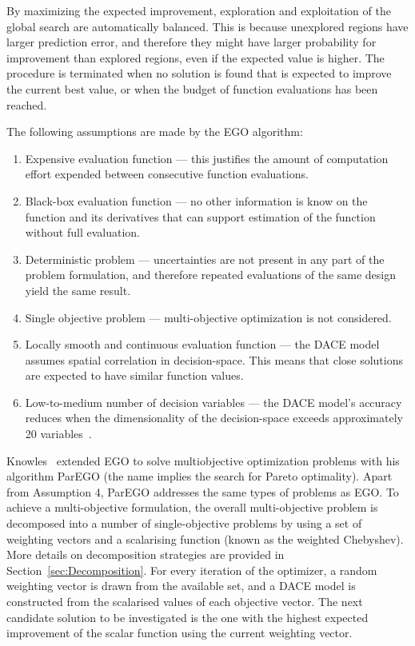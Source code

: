 \documentclass[a4paper]{article}
\begin{document}
By maximizing the expected improvement, exploration and exploitation of the global search are automatically balanced. This is because unexplored regions have larger prediction error, and therefore they might have larger probability for improvement than explored regions, even if the expected value is higher. The procedure is terminated when no solution is found that is expected to improve the current best value, or when the budget of function evaluations has been reached.

The following assumptions are made by the EGO algorithm:
\begin{enumerate}
	\item Expensive evaluation function --- this justifies the amount of computation effort expended between consecutive function evaluations.
	\item Black-box evaluation function --- no other information is know on the function and its derivatives that can support estimation of the function without full evaluation.
	\item Deterministic problem --- uncertainties are not present in any part of the problem formulation, and therefore repeated evaluations of the same design yield the same result.
	\item Single objective problem --- multi-objective optimization is not considered.
	\item Locally smooth and continuous evaluation function --- the DACE model assumes spatial correlation in decision-space.
This means that close solutions are expected to have similar function values.
	\item Low-to-medium number of decision variables --- the DACE model's accuracy reduces when the dimensionality of the decision-space exceeds approximately 20 variables~\cite{Knowles2006ParEGO}.
\end{enumerate}

Knowles~\cite{Knowles2006ParEGO} extended EGO to solve multiobjective optimization problems with his algorithm ParEGO (the name implies the search for Pareto optimality). Apart from Assumption 4, ParEGO addresses the same types of problems as EGO. To achieve a multi-objective formulation, the overall multi-objective problem is decomposed into a number of single-objective problems by using a set of weighting vectors and a scalarising function (known as the weighted Chebyshev). More details on decomposition strategies are provided in Section~\ref{sec:Decomposition}. For every iteration of the optimizer, a random weighting vector is drawn from the available set, and a DACE model is constructed from the scalarised values of each objective vector. The next candidate solution to be investigated is the one with the highest expected improvement of the scalar function using the current weighting vector.
\end{document}

